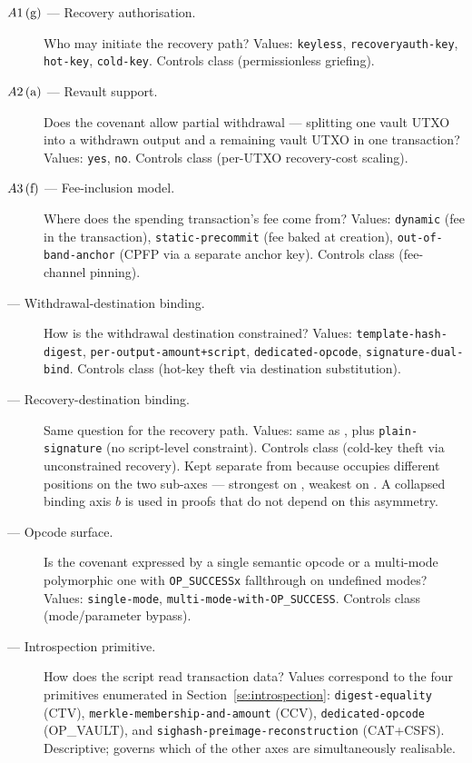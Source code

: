 \begin{description}
\item[$\axauthf{}$ --- Recovery authorisation.] Who may initiate the
  recovery path? Values: \texttt{keyless}, \texttt{recoveryauth-key},
  \texttt{hot-key}, \texttt{cold-key}. Controls class \classgrief{}
  (permissionless griefing).

\item[$\axrevaultf{}$ --- Revault support.] Does the covenant allow
  partial withdrawal --- splitting one vault UTXO into a withdrawn
  output and a remaining vault UTXO in one transaction? Values:
  \texttt{yes}, \texttt{no}. Controls class \classscale{} (per-UTXO
  recovery-cost scaling).

\item[$\axfeef{}$ --- Fee-inclusion model.] Where does the spending
  transaction's fee come from? Values: \texttt{dynamic} (fee in the
  transaction), \texttt{static-precommit} (fee baked at creation),
  \texttt{out-of-band-anchor} (CPFP via a separate anchor key). Controls
  class \classfee{} (fee-channel pinning).

\item[\axwdbind{} --- Withdrawal-destination binding.] How is the
  withdrawal destination constrained? Values:
  \texttt{template-hash-digest}, \texttt{per-output-amount+script},
  \texttt{dedicated-opcode}, \texttt{signature-dual-bind}. Controls
  class \classhot{} (hot-key theft via destination substitution).

\item[\axrecbind{} --- Recovery-destination binding.] Same question
  for the recovery path. Values: same as \axwdbind{}, plus
  \texttt{plain-signature} (no script-level constraint). Controls
  class \classcold{} (cold-key theft via unconstrained recovery).
  Kept separate from \axwdbind{} because \catcsfs{} occupies different
  positions on the two sub-axes --- strongest on \axwdbind{}, weakest
  on \axrecbind{}. A collapsed binding axis $b$ is used in proofs that
  do not depend on this asymmetry.

\item[\axopsurf{} --- Opcode surface.] Is the covenant expressed by
  a single semantic opcode or a multi-mode polymorphic one with
  \texttt{OP\_SUCCESSx} fallthrough on undefined modes? Values:
  \texttt{single-mode}, \texttt{multi-mode-with-OP\_SUCCESS}. Controls
  class \classmode{} (mode/parameter bypass).

\item[\axintro{} --- Introspection primitive.] How does the script
  read transaction data? Values correspond to the four primitives
  enumerated in Section~\ref{se:introspection}:
  \texttt{digest-equality} (CTV),
  \texttt{merkle-membership-and-amount} (CCV),
  \texttt{dedicated-opcode} (OP\_VAULT), and
  \texttt{sighash-preimage-reconstruction} (CAT+CSFS). Descriptive;
  governs which of the other axes are simultaneously realisable.
\end{description}

